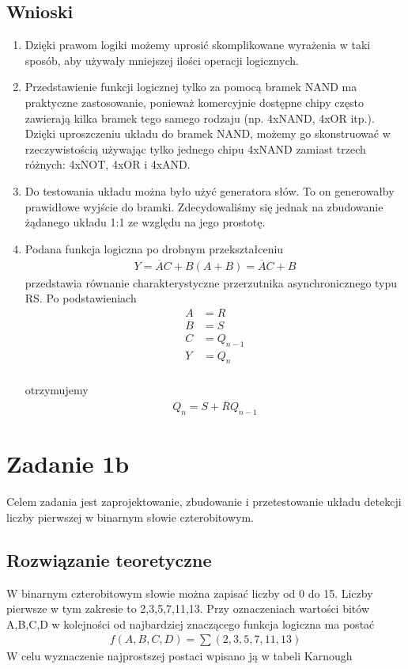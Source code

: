 \documentclass[12pt,a4paper,openright]{mwrep}
\begin{document}
\section{Wnioski}
\begin{enumerate}
    \item Dzięki prawom logiki możemy uprosić skomplikowane wyrażenia
    w taki sposób, aby używały mniejszej ilości operacji logicznych.
    \item Przedstawienie funkcji logicznej tylko za pomocą bramek NAND
    ma praktyczne zastosowanie, ponieważ komercyjnie dostępne chipy często
    zawierają kilka bramek tego samego rodzaju (np. 4xNAND, 4xOR itp.).
    Dzięki uproszczeniu układu do bramek NAND, możemy go skonstruować
    w rzeczywistością używając tylko jednego chipu 4xNAND zamiast
    trzech różnych: 4xNOT, 4xOR i 4xAND.
    \item Do testowania układu można było użyć generatora słów. To on 
    generowałby prawidłowe wyjście do bramki. Zdecydowaliśmy się jednak
    na zbudowanie żądanego układu 1:1 ze względu na jego prostotę.
    \item Podana funkcja logiczna po drobnym przekształceniu
    \begin{align*}
        Y = \overline{A}C + B(A + B) = \overline{A}C + B
    \end{align*}
    przedstawia równanie charakterystyczne przerzutnika 
    asynchronicznego typu RS. 
    Po podstawieniach
    \begin{align*}
        A &= R\\
        B &= S\\
        C &= Q_{n-1}\\
        Y &= Q_{n}\\
    \end{align*}
        
    otrzymujemy
    \begin{align*}
        Q_{n} = S + \overline{R}Q_{n-1}
    \end{align*}
\end{enumerate}
\chapter{Zadanie 1b}
Celem zadania jest zaprojektowanie, zbudowanie i przetestowanie 
układu detekcji liczby pierwszej w binarnym słowie czterobitowym.
\section{Rozwiązanie teoretyczne}
W binarnym czterobitowym słowie można zapisać liczby od 0 do 15.
Liczby pierwsze w tym zakresie to 2,3,5,7,11,13.
Przy oznaczeniach wartości bitów A,B,C,D w kolejności od najbardziej znaczącego funkcja logiczna ma postać
\begin{align*}
    f(A,B,C,D) = \sum(2,3,5,7,11,13)
\end{align*}
W celu wyznaczenie najprostszej postaci wpisano ją w tabeli Karnough
    
\end{document}
